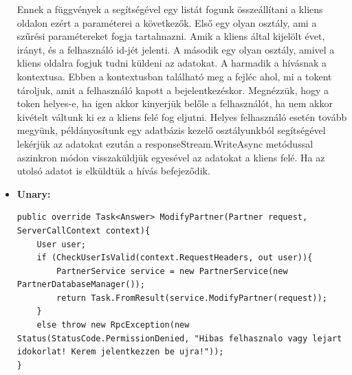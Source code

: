 \documentclass[
]{thesis-ekf}
\theoremstyle{definition}
\theoremstyle{remark}
\begin{document}
\begin{itemize}[leftmargin=0pt]
\begin{lstlisting}[showstringspaces=false,caption={Iktatások küldése a kliens számára.},captionpos=b]
	\end{lstlisting}
	Ennek a függvények a segítségével egy listát fogunk összeállítani a kliens oldalon ezért a paraméterei a következők. Első egy olyan osztály, ami a szűrési paramétereket fogja tartalmazni. Amik a kliens által kijelölt évet, irányt, és a felhasználó id-jét jelenti. A második egy olyan osztály, amivel a kliens oldalra fogjuk tudni küldeni az adatokat. A harmadik a hívásnak a kontextusa. Ebben a kontextusban található meg a fejléc ahol, mi a tokent tároljuk, amit a felhasználó kapott a bejelentkezéskor. Megnézzük, hogy a token helyes-e, ha igen akkor kinyerjük belőle a felhasználót, ha nem akkor kivételt váltunk ki ez a kliens felé fog eljutni.\cite{errorhandling}  Helyes felhasználó esetén tovább megyünk, példányosítunk egy adatbázis kezelő osztályunkból segítségével lekérjük az adatokat ezután a responseStream.WriteAsync metódussal aszinkron módon visszaküldjük egyesével az adatokat a kliens felé. Ha az utolsó adatot is elküldtük a hívás befejeződik.
	\item \textbf{Unary: }
		\begin{lstlisting}[showstringspaces=false,caption={Partner módosítása.},captionpos=b]
public override Task<Answer> ModifyPartner(Partner request, ServerCallContext context){
	User user;
	if (CheckUserIsValid(context.RequestHeaders, out user)){
		PartnerService service = new PartnerService(new PartnerDatabaseManager());
		return Task.FromResult(service.ModifyPartner(request));
	}
	else throw new RpcException(new Status(StatusCode.PermissionDenied, "Hibas felhasznalo vagy lejart idokorlat! Kerem jelentkezzen be ujra!"));
}


\end{lstlisting}
\end{itemize}
\end{document}

